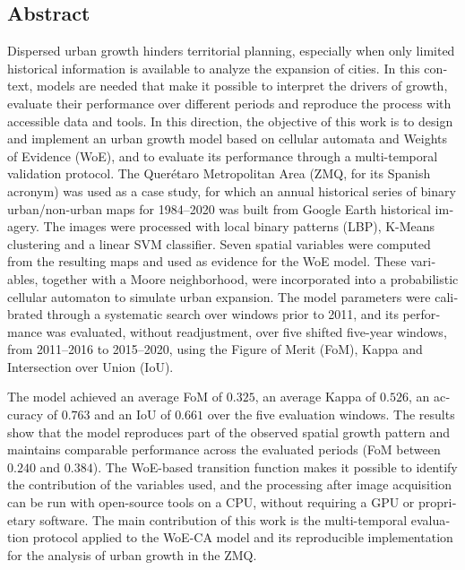 \begin{otherlanguage}{english}
\chapter*{Abstract}
\vspace*{-1.2cm}

{\color{red}
Dispersed urban growth hinders territorial planning, especially when only
limited historical information is available to analyze the expansion of cities.
In this context, models are needed that make it possible to interpret the
drivers of growth, evaluate their performance over different periods and
reproduce the process with accessible data and tools. In this direction, the
objective of this work is to design and implement an urban growth model based on
cellular automata and Weights of Evidence (WoE), and to evaluate its performance
through a multi-temporal validation protocol. The Querétaro Metropolitan Area
(ZMQ, for its Spanish acronym) was used as a case study, for which an annual
historical series of binary urban/non-urban maps for 1984--2020 was built from
Google Earth historical imagery. The images were processed with local binary
patterns (LBP), K-Means clustering and a linear SVM classifier. Seven spatial
variables were computed from the resulting maps and used as evidence for the
WoE model. These variables, together with a Moore neighborhood, were
incorporated into a probabilistic cellular automaton to simulate urban
expansion. The model parameters were calibrated through a systematic search
over windows prior to 2011, and its performance was evaluated, without
readjustment, over five shifted five-year windows, from 2011--2016 to
2015--2020, using the Figure of Merit (FoM), Kappa and Intersection over Union
(IoU).

The model achieved an average FoM of $0.325$, an average Kappa of $0.526$, an
accuracy of $0.763$ and an IoU of $0.661$ over the five evaluation windows. The
results show that the model reproduces part of the observed spatial growth
pattern and maintains comparable performance across the evaluated periods (FoM
between $0.240$ and $0.384$). The WoE-based transition function makes it
possible to identify the contribution of the variables used, and the processing
after image acquisition can be run with open-source tools on a CPU, without
requiring a GPU or proprietary software. The main contribution of this work is
the multi-temporal evaluation protocol applied to the WoE-CA model and its
reproducible implementation for the analysis of urban growth in the ZMQ.
}


\end{otherlanguage}

